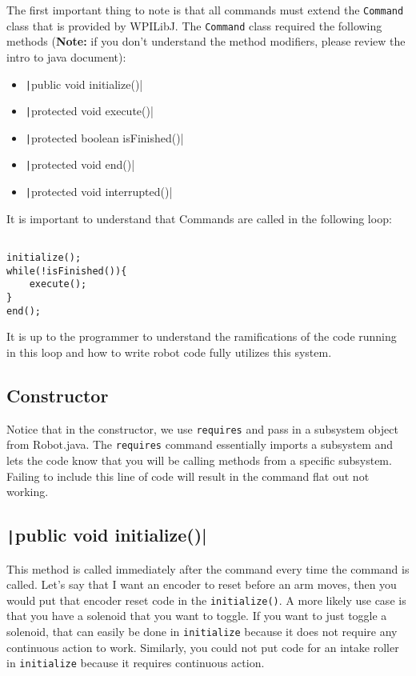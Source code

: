 \documentclass[11pt,fleqn]{article}
\newcommand{\mil}[2][java]{\texttt|#2|}
\begin{document}
The first important thing to note is that all commands must extend the \texttt{Command} class that
is provided by WPILibJ. The \texttt{Command} class required the following methods (\textbf{Note:}
if you don't understand the method modifiers, please review the intro to java document):
\begin{itemize}
    \item
    \mil{public void initialize()}

    \item
    \mil{protected void execute()}

    \item
    \mil{protected boolean isFinished()}

    \item
    \mil{protected void end()}

    \item
    \mil{protected void interrupted()}
\end{itemize}

It is important to understand that Commands are called in the following loop:

\begin{verbatim}

initialize();
while(!isFinished()){
    execute();
}
end();
\end{verbatim}

It is up to the programmer to understand the ramifications of the code running in this loop and how
to write robot code fully utilizes this system.

\subsection{Constructor}
Notice that in the constructor, we use \texttt{requires} and pass in a subsystem object from
Robot.java. The \texttt{requires} command essentially imports a subsystem and lets the code know
that you will be calling methods from a specific subsystem. Failing to include this line of code
will result in the command flat out not working.

\subsection{\mil{public void initialize()}}
This method is called immediately after the command every time the command is called. Let's say
that I want an encoder to reset before an arm moves, then you would put that encoder reset code in
the \texttt{initialize()}. A more likely use case is that you have a solenoid that you want to
toggle. If you want to just toggle a solenoid, that can easily be done in \texttt{initialize}
because it does not require any continuous action to work. Similarly, you could not put code for an
intake roller in \texttt{initialize} because it requires continuous action.
\end{document}
